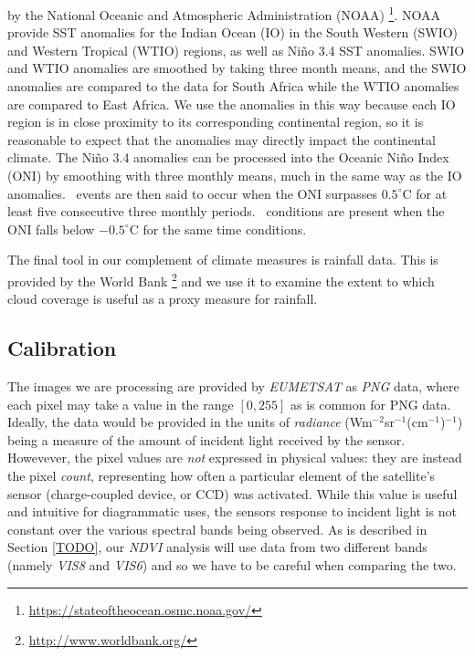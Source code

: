 by the National Oceanic and Atmospheric Administration
(NOAA) \footnote{\url{https://stateoftheocean.osmc.noaa.gov/}}. NOAA
provide SST anomalies for the Indian Ocean (IO) in the South Western
(SWIO) and Western Tropical (WTIO) regions, as well as Ni{\~n}o 3.4
SST anomalies. SWIO and WTIO anomalies are smoothed by taking three
month means, and the SWIO anomalies are compared to the data for South
Africa while the WTIO anomalies are compared to East Africa. We use
the anomalies in this way because each IO region is in close proximity
to its corresponding continental region, so it is reasonable to expect
that the anomalies may directly impact the continental climate. The
Ni{\~n}o 3.4 anomalies can be processed into the Oceanic Ni{\~n}o
Index (ONI) by smoothing with three monthly means, much in the same
way as the IO anomalies. \elnino\ events are then said to occur when
the ONI surpasses $0.5^{\circ}$C for at least five consecutive three
monthly periods. \nina\
conditions are present when the ONI falls
below $-0.5^{\circ}$C for the same time conditions.

The final tool in our complement of climate measures is rainfall
data. This is provided by the World
Bank \footnote{\url{http://www.worldbank.org/}} and we use it to
examine the extent to which cloud coverage is useful as a proxy
measure for rainfall.

\subsection{Calibration}
\label{sec:data:calib}

The images we are processing are provided by \emph{EUMETSAT} as
\emph{PNG} data, where each pixel may take a value in the range
$\left[0, 255\right]$ as is common for PNG data. Ideally, the data
would be provided in the units of \emph{radiance}
(Wm$^{-2}$sr$^{-1}$(cm$^{-1}$)$^{-1}$) being a measure of the amount
of incident light received by the sensor. Howevever, the pixel values
are \emph{not} expressed in physical values: they are instead the
pixel \emph{count}, representing how often a particular element of the
satellite's sensor (charge-coupled device, or CCD) was
activated. While this value is useful and intuitive for diagrammatic
uses, the sensors response to incident light is not constant over the
various spectral bands being observed. As is described in Section
\ref{TODO}, our \emph{NDVI} analysis will use data from two different
bands (namely \emph{VIS8} and \emph{VIS6}) and so we have to be
careful when comparing the two.

